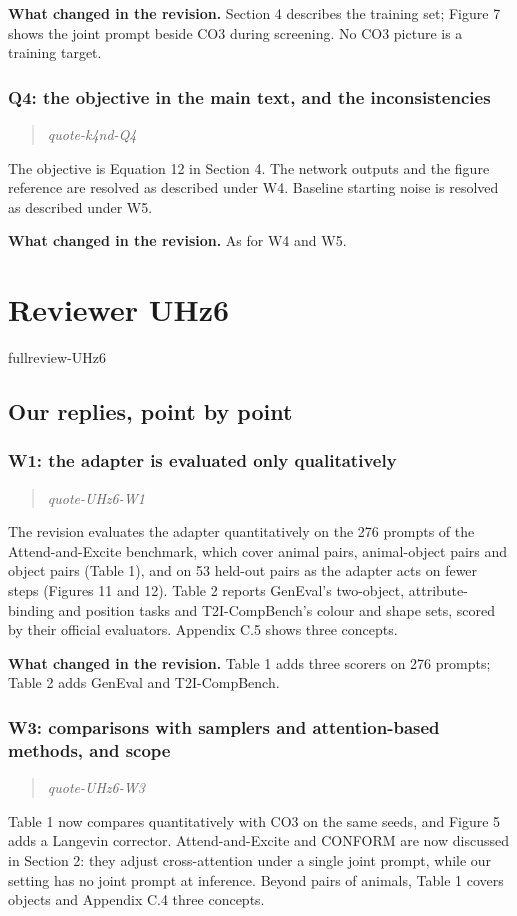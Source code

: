 \documentclass[11pt]{article}
\def\showfullreviews{}   %
\def\showquotes{}        %
\newcommand{\fullreview}[1]{\ifdefined\showfullreviews\csname fullreview-#1\endcsname\fi}
\newcommand{\reviewquote}[2]{\ifdefined\showquotes\begin{quote}\color{rev}\itshape\csname quote-#1-#2\endcsname\end{quote}\fi}
\newcommand{\changed}[1]{\par{\color{chg}\textbf{What changed in the revision.}} #1\par}
\begin{document}
\changed{Section 4 describes the training set; Figure 7 shows the joint prompt beside CO3 during screening. No CO3 picture is a training target.}

\subsubsection*{Q4: the objective in the main text, and the inconsistencies}
\reviewquote{k4nd}{Q4}

The objective is Equation 12 in Section 4. The network outputs and the figure reference are resolved as described under W4. Baseline starting noise is resolved as described under W5.

\changed{As for W4 and W5.}

\section*{Reviewer UHz6}
\fullreview{UHz6}

\subsection*{Our replies, point by point}

\subsubsection*{W1: the adapter is evaluated only qualitatively}
\reviewquote{UHz6}{W1}

The revision evaluates the adapter quantitatively on the 276 prompts of the Attend-and-Excite benchmark, which cover animal pairs, animal-object pairs and object pairs (Table 1), and on 53 held-out pairs as the adapter acts on fewer steps (Figures 11 and 12). Table 2 reports GenEval's two-object, attribute-binding and position tasks and T2I-CompBench's colour and shape sets, scored by their official evaluators. Appendix C.5 shows three concepts.

\changed{Table 1 adds three scorers on 276 prompts; Table 2 adds GenEval and T2I-CompBench.}

\subsubsection*{W3: comparisons with samplers and attention-based methods, and scope}
\reviewquote{UHz6}{W3}

Table 1 now compares quantitatively with CO3 on the same seeds, and Figure 5 adds a Langevin corrector. Attend-and-Excite and CONFORM are now discussed in Section 2: they adjust cross-attention under a single joint prompt, while our setting has no joint prompt at inference. Beyond pairs of animals, Table 1 covers objects and Appendix C.4 three concepts.
\end{document}
